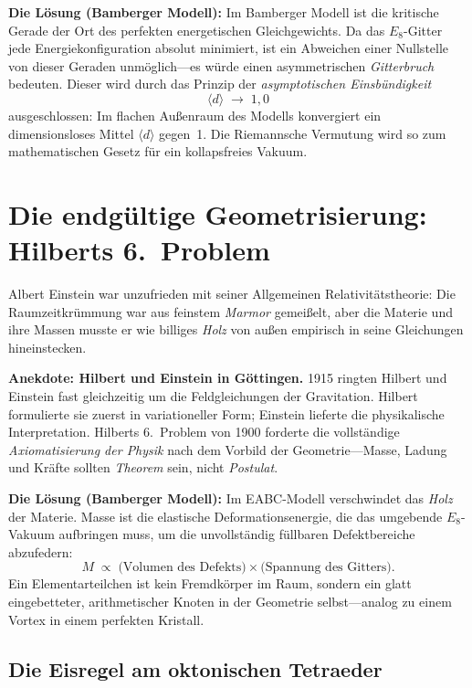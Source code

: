 \documentclass[11pt,a4paper]{article}
\newcommand{\Eoct}{E_8}
\begin{document}
\textbf{Die Lösung (Bamberger Modell):} Im Bamberger Modell ist die kritische Gerade der Ort des perfekten energetischen Gleichgewichts. Da das $\Eoct$-Gitter jede Energiekonfiguration absolut minimiert, ist ein Abweichen einer Nullstelle von dieser Geraden unmöglich---es würde einen asymmetrischen \emph{Gitterbruch} bedeuten. Dieser wird durch das Prinzip der \emph{asymptotischen Einsbündigkeit}
\begin{equation}
  \langle d \rangle \;\longrightarrow\; 1{,}0
  \label{eq:einsbuendigkeit}
\end{equation}
ausgeschlossen: Im flachen Außenraum des Modells konvergiert ein dimensionsloses Mittel $\langle d \rangle$ gegen~1. Die Riemannsche Vermutung wird so zum mathematischen Gesetz für ein kollapsfreies Vakuum.

\section{Die endgültige Geometrisierung: Hilberts 6.\ Problem}

Albert Einstein war unzufrieden mit seiner Allgemeinen Relativitätstheorie: Die Raumzeitkrümmung war aus feinstem \emph{Marmor} gemeißelt, aber die Materie und ihre Massen musste er wie billiges \emph{Holz} von außen empirisch in seine Gleichungen hineinstecken.

\medskip
\noindent\textbf{Anekdote: Hilbert und Einstein in Göttingen.} 1915 ringten Hilbert und Einstein fast gleichzeitig um die Feldgleichungen der Gravitation. Hilbert formulierte sie zuerst in variationeller Form; Einstein lieferte die physikalische Interpretation. Hilberts 6.\ Problem von 1900 forderte die vollständige \emph{Axiomatisierung der Physik} nach dem Vorbild der Geometrie---Masse, Ladung und Kräfte sollten \emph{Theorem} sein, nicht \emph{Postulat}.

\textbf{Die Lösung (Bamberger Modell):} Im EABC-Modell verschwindet das \emph{Holz} der Materie. Masse ist die elastische Deformationsenergie, die das umgebende $\Eoct$-Vakuum aufbringen muss, um die unvollständig füllbaren Defektbereiche abzufedern:
\begin{equation}
  M \;\propto\; \text{(Volumen des Defekts)} \times \text{(Spannung des Gitters)}.
\end{equation}
Ein Elementarteilchen ist kein Fremdkörper im Raum, sondern ein glatt eingebetteter, arithmetischer Knoten in der Geometrie selbst---analog zu einem Vortex in einem perfekten Kristall.

\subsection{Die Eisregel am oktonischen Tetraeder}
\end{document}

